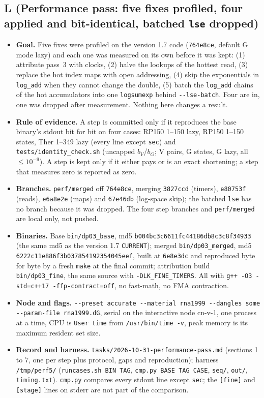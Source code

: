\documentclass[11pt]{article}
\begin{document}
\subsection{L (Performance pass: five fixes profiled, four applied and bit-identical, batched \texttt{lse} dropped)}
\begin{itemize}[leftmargin=*]
  \item \textbf{Goal.} Five fixes were profiled on the version 1.7 code (\texttt{764e8ce}, default G mode lazy) and each one was measured on its own before it was kept: (1) attribute pass~3 with clocks, (2) halve the lookups of the hottest read, (3) replace the hot index maps with open addressing, (4) skip the exponentials in \texttt{log\_add} when they cannot change the double, (5) batch the \texttt{log\_add} chains of the hot accumulators into one \texttt{logsumexp} behind \texttt{-{}-lse-batch}. Four are in, one was dropped after measurement. Nothing here changes a result.
  \item \textbf{Rule of evidence.} A step is committed only if it reproduces the base binary's stdout bit for bit on four cases: RP150 1--150 lazy, RP150 1--150 states, Ther 1--349 lazy (every line except \texttt{sec}) and \texttt{tests/identity\_check.sh} (uncapped $b_V$/$b_G$; V pairs, G states, G lazy, all $\le 10^{-9}$). A step is kept only if it either pays or is an exact shortening; a step that measures zero is reported as zero.
  \item \textbf{Branches.} \texttt{perf/merged} off \texttt{764e8ce}, merging \texttt{3827ccd} (timers), \texttt{e80753f} (reads), \texttt{e6a8e2e} (maps) and \texttt{67e46db} (log-space skip); the batched \texttt{lse} has no branch because it was dropped. The four step branches and \texttt{perf/merged} are local only, not pushed.
  \item \textbf{Binaries.} Base \texttt{bin/dp03\_base}, md5 \texttt{b004bc3c6611fc44186db8c3c8f34933} (the same md5 as the version 1.7 \texttt{CURRENT}); merged \texttt{bin/dp03\_merged}, md5 \texttt{6222c11e886f3b037854192354045eef}, built at \texttt{6e8e3dc} and reproduced byte for byte by a fresh \texttt{make} at the final commit; attribution build \texttt{bin/dp03\_fine}, the same source with \texttt{-DLK\_FINE\_TIMERS}. All with \texttt{g++ -O3 -std=c++17 -ffp-contract=off}, no fast-math, no FMA contraction.
  \item \textbf{Node and flags.} \texttt{-{}-preset accurate -{}-material rna1999 -{}-dangles some -{}-param-file rna1999.dG}, serial on the interactive node cn-v-1, one process at a time, CPU is \texttt{User time} from \texttt{/usr/bin/time -v}, peak memory is its maximum resident set size.
  \item \textbf{Record and harness.} \texttt{tasks/2026-10-31-performance-pass.md} (sections 1 to 7, one per step plus protocol, gaps and reproduction); harness \texttt{/tmp/perf5/} (\texttt{runcases.sh BIN TAG}, \texttt{cmp.py BASE TAG CASE}, \texttt{seq/}, \texttt{out/}, \texttt{timing.txt}). \texttt{cmp.py} compares every stdout line except \texttt{sec}; the \texttt{[fine]} and \texttt{[stage]} lines on stderr are not part of the comparison.
\end{itemize}
\end{document}
